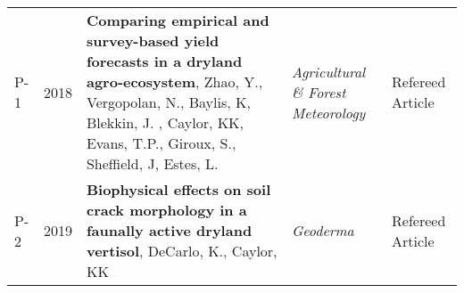
\begin{supertabular}{lcp{8.25cm}p{4.75cm}p{1.75cm}}
P-1 & 2018 & {\bf Comparing empirical and survey-based yield forecasts in a dryland agro-ecosystem}, Zhao, Y., Vergopolan, N., Baylis, K, Blekkin, J. , Caylor, KK, Evans, T.P., Giroux, S., Sheffield, J, Estes, L.  & \emph{ Agricultural \& Forest Meteorology } & Refereed Article\\
P-2 & 2019 & {\bf Biophysical effects on soil crack morphology in a faunally active dryland vertisol}, DeCarlo, K., Caylor, KK  & \emph{ Geoderma } & Refereed Article\\
\end{supertabular}

